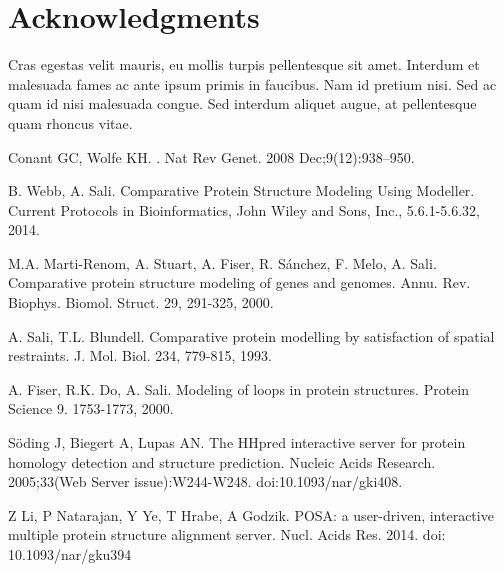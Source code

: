 \documentclass[10pt,letterpaper]{article}
\begin{document}
\section*{Acknowledgments}
Cras egestas velit mauris, eu mollis turpis pellentesque sit amet. Interdum et malesuada fames ac ante ipsum primis in faucibus. Nam id pretium nisi. Sed ac quam id nisi malesuada congue. Sed interdum aliquet augue, at pellentesque quam rhoncus vitae.

\nolinenumbers

%
%
% 
\begin{thebibliography}{10}

Conant GC, Wolfe KH.
.
\newblock Nat Rev Genet. 2008 Dec;9(12):938--950.

B. Webb, A. Sali.
\newblock Comparative Protein Structure Modeling Using Modeller.
\newblock Current Protocols in Bioinformatics, John Wiley and Sons, Inc., 5.6.1-5.6.32, 2014.

M.A. Marti-Renom, A. Stuart, A. Fiser, R. Sánchez, F. Melo, A. Sali. 
\newblock Comparative protein structure modeling of genes and genomes.
\newblock Annu. Rev. Biophys. Biomol. Struct. 29, 291-325, 2000.

A. Sali, T.L. Blundell.
\newblock Comparative protein modelling by satisfaction of spatial restraints.
\newblock J. Mol. Biol. 234, 779-815, 1993.

A. Fiser, R.K. Do, A. Sali.
\newblock Modeling of loops in protein structures.
\newblock Protein Science 9. 1753-1773, 2000.

Söding J, Biegert A, Lupas AN.
\newblock The HHpred interactive server for protein homology detection and structure prediction. 
\newblock Nucleic Acids Research. 2005;33(Web Server issue):W244-W248. doi:10.1093/nar/gki408.

Z Li, P Natarajan, Y Ye, T Hrabe, A Godzik.
\newblock POSA: a user-driven, interactive multiple protein structure alignment server.
\newblock Nucl. Acids Res. 2014. doi: 10.1093/nar/gku394

\end{thebibliography}
\end{document}
